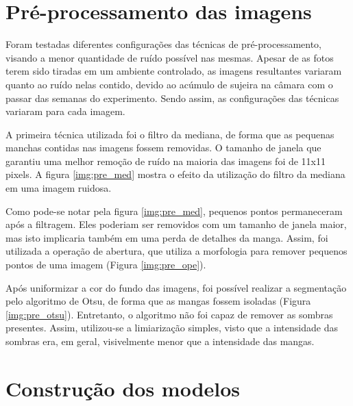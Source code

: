 \section{Pré-processamento das imagens}

Foram testadas diferentes configurações das técnicas de pré-processamento, visando a menor quantidade de ruído possível nas mesmas. Apesar de as fotos terem sido tiradas em um ambiente controlado, as imagens resultantes variaram quanto ao ruído nelas contido, devido ao acúmulo de sujeira na câmara com o passar das semanas do experimento. Sendo assim, as configurações das técnicas variaram para cada imagem.

A primeira técnica utilizada foi o filtro da mediana, de forma que as pequenas manchas contidas nas imagens fossem removidas. O tamanho de janela que garantiu uma melhor remoção de ruído na maioria das imagens foi de 11x11 pixels. A figura \ref{img:pre_med} mostra o efeito da utilização do filtro da mediana em uma imagem ruidosa.

Como pode-se notar pela figura \ref{img:pre_med}, pequenos pontos permaneceram após a filtragem. Eles poderiam ser removidos com um tamanho de janela maior, mas isto implicaria também em uma perda de detalhes da manga. Assim, foi utilizada a operação de abertura, que utiliza a morfologia para remover pequenos pontos de uma imagem (Figura \ref{img:pre_ope}).

Após uniformizar a cor do fundo das imagens, foi possível realizar a segmentação pelo algoritmo de Otsu, de forma que as mangas fossem isoladas (Figura \ref{img:pre_otsu}). Entretanto, o algoritmo não foi capaz de remover as sombras presentes. Assim, utilizou-se a limiarização simples, visto que a intensidade das sombras era, em geral, visivelmente menor que a intensidade das mangas. 

\section{Construção dos modelos}



